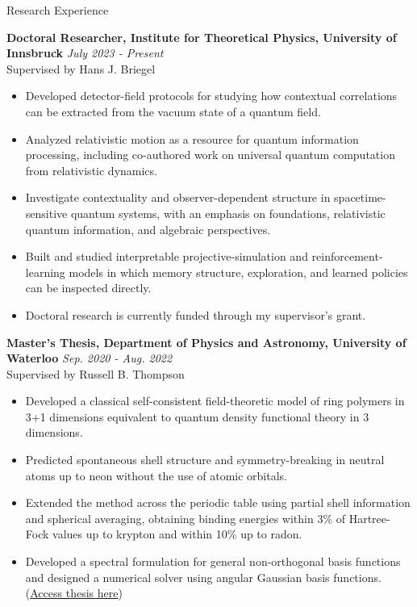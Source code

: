 \documentclass{resume} %
\begin{document}
\vspace{1em}

\begin{rSection}{Research Experience}

{\bf Doctoral Researcher, Institute for Theoretical Physics, University of Innsbruck} \hfill{\textit{July 2023 - Present}}\\
Supervised by Hans J. Briegel
\begin{itemize}
\item Developed detector-field protocols for studying how contextual correlations can be extracted from the vacuum state of a quantum field.
\item Analyzed relativistic motion as a resource for quantum information processing, including co-authored work on universal quantum computation from relativistic dynamics.
\item Investigate contextuality and observer-dependent structure in spacetime-sensitive quantum systems, with an emphasis on foundations, relativistic quantum information, and algebraic perspectives.
\item Built and studied interpretable projective-simulation and reinforcement-learning models in which memory structure, exploration, and learned policies can be inspected directly.
\item Doctoral research is currently funded through my supervisor's grant.
\end{itemize}

{\bf Master's Thesis, Department of Physics and Astronomy, University of Waterloo} \hfill{\textit{Sep. 2020 - Aug. 2022}}\\
Supervised by Russell B. Thompson
\begin{itemize}
\item Developed a classical self-consistent field-theoretic model of ring polymers in 3+1 dimensions equivalent to quantum density functional theory in 3 dimensions.
\item Predicted spontaneous shell structure and symmetry-breaking in neutral atoms up to neon without the use of atomic orbitals.
\item Extended the method across the periodic table using partial shell information and spherical averaging, obtaining binding energies within 3\% of Hartree-Fock values up to krypton and within 10\% up to radon.
\item Developed a spectral formulation for general non-orthogonal basis functions and designed a numerical solver using angular Gaussian basis functions. (\href{https://uwspace.uwaterloo.ca/handle/10012/18577}{Access thesis here})
\end{itemize}


\end{rSection}
\end{document}
